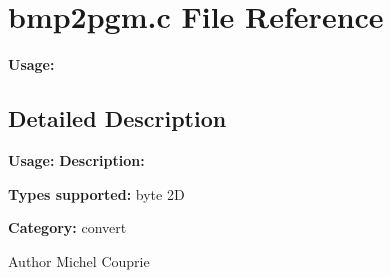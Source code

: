 \section{bmp2pgm.c File Reference}
\label{bmp2pgm_8c}


{\bfseries Usage:}  




\subsection{Detailed Description}
{\bfseries Usage:} {\bfseries Description:}

{\bfseries Types supported:} byte 2D

{\bfseries Category:} convert

\begin{DoxyAuthor}{Author}
Michel Couprie 
\end{DoxyAuthor}
